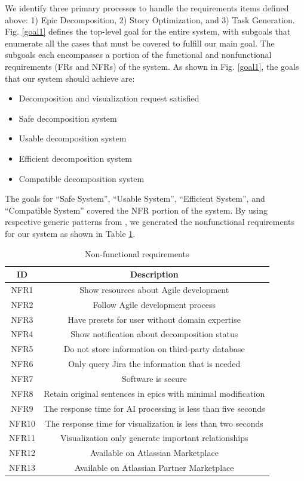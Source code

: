 We identify three primary processes to handle the requirements items defined above: 1) Epic Decomposition, 2) Story Optimization, and 3) Task Generation. Fig. \ref{goal1} defines the top-level goal for the entire system, with subgoals that enumerate all the cases that must be covered to fulfill our main goal. The subgoals each encompasses a portion of the functional and nonfunctional requirements (FRs and NFRs) of the system. As shown in Fig. \ref{goal1}, the goals that our system should achieve are:

\begin{itemize}
	\item Decomposition and visualization request satisfied
	\item Safe decomposition system
	\item Usable decomposition system
	\item Efficient decomposition system
	\item Compatible decomposition system
\end{itemize}

The goals for “Safe System”, “Usable System”, “Efficient System”, and “Compatible System” covered the NFR portion of the system. By using respective generic patterns from \cite{KAOS}, we generated the nonfunctional requirements for our system as shown in Table \ref{nfrs}.

\begin{table}
\centering
\caption{Non-functional requirements}
\label{nfrs}
\begin{tabular}{ |c|c| } 
\hline
\multicolumn{1}{|c|}{\textbf{ID}} & \multicolumn{1}{c|}{\textbf{Description}} \\
\hline
NFR1 & Show resources about Agile development \\
\hline
NFR2 & Follow Agile development process \\
\hline
NFR3 & Have presets for user without domain expertise \\
\hline
NFR4 & Show notification about decomposition status \\
\hline
NFR5 & Do not store information on third-party database \\
\hline
NFR6 & Only query Jira the information that is needed \\
\hline
NFR7 & Software is secure \\
\hline
NFR8 & Retain original sentences in epics with minimal modification \\
\hline
NFR9 & The response time for AI processing is less than five seconds \\
\hline
NFR10 & The response time for visualization is less than two seconds \\
\hline
NFR11 & Visualization only generate important relationships \\
\hline
NFR12 & Available on Atlassian Marketplace \\
\hline
NFR13 & Available on Atlassian Partner Marketplace \\
\hline
\end{tabular}
\end{table}

